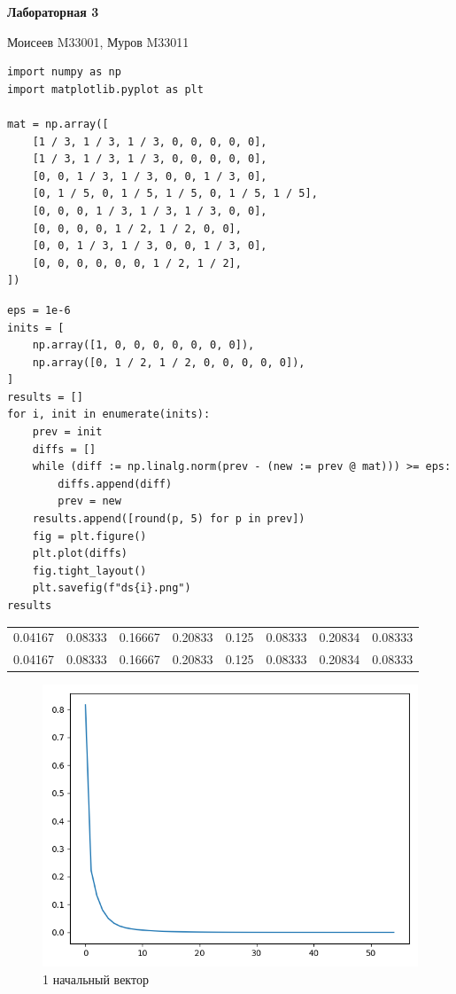 \documentclass[11pt]{article}
\author{megabluejay}
\date{}
\title{}
\begin{document}
\begin{center}
\textbf{Лабораторная 3}

Моисеев M33001, Муров M33011
\end{center}

\begin{verbatim}
import numpy as np
import matplotlib.pyplot as plt

mat = np.array([
    [1 / 3, 1 / 3, 1 / 3, 0, 0, 0, 0, 0],
    [1 / 3, 1 / 3, 1 / 3, 0, 0, 0, 0, 0],
    [0, 0, 1 / 3, 1 / 3, 0, 0, 1 / 3, 0],
    [0, 1 / 5, 0, 1 / 5, 1 / 5, 0, 1 / 5, 1 / 5],
    [0, 0, 0, 1 / 3, 1 / 3, 1 / 3, 0, 0],
    [0, 0, 0, 0, 1 / 2, 1 / 2, 0, 0],
    [0, 0, 1 / 3, 1 / 3, 0, 0, 1 / 3, 0],
    [0, 0, 0, 0, 0, 0, 1 / 2, 1 / 2],
])
\end{verbatim}

\begin{verbatim}
eps = 1e-6
inits = [
    np.array([1, 0, 0, 0, 0, 0, 0, 0]),
    np.array([0, 1 / 2, 1 / 2, 0, 0, 0, 0, 0]),
]
results = []
for i, init in enumerate(inits):
    prev = init
    diffs = []
    while (diff := np.linalg.norm(prev - (new := prev @ mat))) >= eps:
        diffs.append(diff)
        prev = new
    results.append([round(p, 5) for p in prev])
    fig = plt.figure()
    plt.plot(diffs)
    fig.tight_layout()
    plt.savefig(f"ds{i}.png")
results
\end{verbatim}

\begin{center}
\begin{tabular}{rrrrrrrr}
0.04167 & 0.08333 & 0.16667 & 0.20833 & 0.125 & 0.08333 & 0.20834 & 0.08333\\[0pt]
0.04167 & 0.08333 & 0.16667 & 0.20833 & 0.125 & 0.08333 & 0.20834 & 0.08333\\[0pt]
\end{tabular}
\end{center}

\begin{figure}[htbp]
\centering
\includegraphics[width=.9\linewidth]{./ds0.png}
\caption{1 начальный вектор}
\end{figure}
\end{document}
